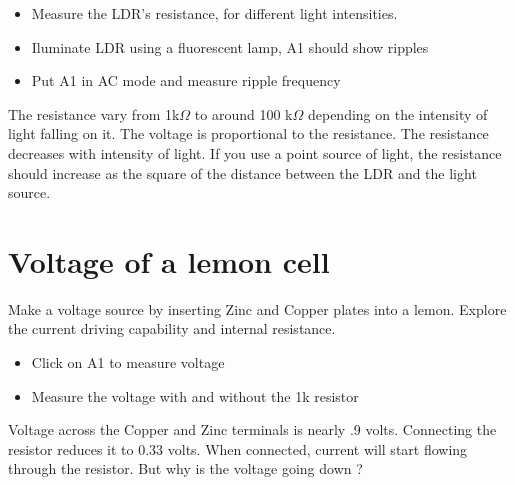 \documentclass[a4paper,12pt,english]{sphinxmanual}
\let\sphinxpxdimen\pdfpxdimen\else\newdimen\sphinxpxdimen
\begin{document}
\noindent\sphinxincludegraphics[width=300\sphinxpxdimen]{{ldr}.pdf}

\begin{itemize}
\item {} 
Measure the LDR’s resistance, for different light intensities.

\item {} 
Iluminate LDR using a fluorescent lamp, A1 should show ripples

\item {} 
Put A1 in AC mode and measure ripple frequency

\end{itemize}


The resistance vary from 1k\(\Omega\) to around 100 k\(\Omega\) depending on the intensity
of light falling on it. The voltage is proportional to the resistance.
The resistance decreases with intensity of light. If you use a point
source of light, the resistance should increase as the square of the
distance between the LDR and the light source.


\section{Voltage of a lemon cell}
\label{\detokenize{2.15:voltage-of-a-lemon-cell}}\label{\detokenize{2.15::doc}}

Make a voltage source by inserting Zinc and Copper plates into a lemon.
Explore the current driving capability and internal resistance.

\noindent\sphinxincludegraphics[width=300\sphinxpxdimen]{{lemon-cell}.pdf}

\begin{itemize}
\item {} 
Click on A1 to measure voltage

\item {} 
Measure the voltage with and without the 1k resistor

\end{itemize}


Voltage across the Copper and Zinc terminals is nearly .9 volts.
Connecting the resistor reduces it to 0.33 volts. When connected,
current will start flowing through the resistor. But why is the voltage
going down ?
\end{document}
